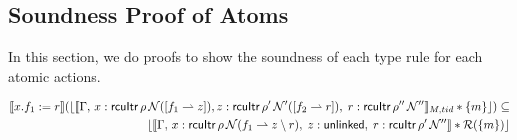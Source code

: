  \subsection{Soundness Proof of Atoms}
 \label{lem:lematom}
 In this section, we do proofs to show the soundness of each type rule for each atomic actions.
 \begin{lemma}\small
   \label{lemma:unlink}
\begin{align*}
  \llbracket x.f_1:=r \rrbracket (\lfloor \llbracket \Gamma, \, x:\mathsf{rcuItr}\,\rho\,\mathcal{N} ( [f_1 \rightharpoonup  z]), z:\mathsf{rcuItr} \, \rho' \,\mathcal{N}'([ f_2 \rightharpoonup r]), \;
  r:\mathsf{rcuItr} \, \rho'' \,\mathcal{N}'' \rrbracket_{M,tid} * \{m\}\rfloor)     \subseteq \\
   \lfloor \llbracket \Gamma, \,  x:\mathsf{rcuItr} \, \rho \, \mathcal{N}( f_1 \rightharpoonup z \setminus r),\;
                                                              z:\mathsf{unlinked}, \;
                                                              r:\mathsf{rcuItr} \, \rho' \, \mathcal{N}'' \rrbracket  * \mathcal{R}(\{m\})\rfloor
\end{align*}
 \end{lemma}
